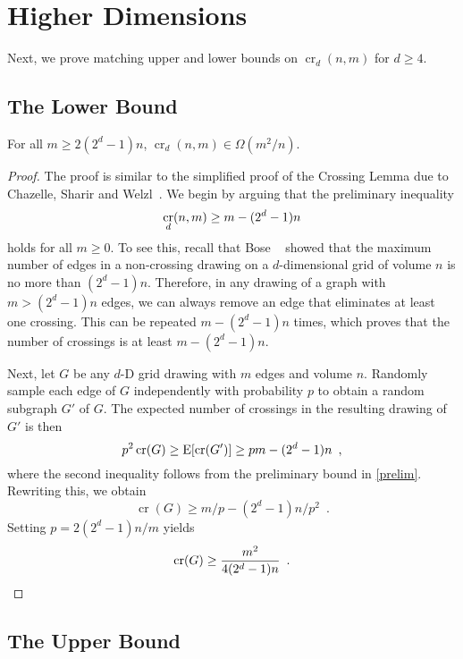 \documentclass{patmorin}
\DeclareMathOperator{\crs}{cr}
\begin{document}
\section{Higher Dimensions}

Next, we prove matching upper and lower bounds on $\crs_d(n,m)$ for
$d\ge 4$.

\subsection{The Lower Bound}

\begin{thm}
  For all $m\ge 2(2^d-1)n$, $\crs_d(n,m)\in\Omega(m^2/n)$.
\end{thm}

\begin{proof}
  The proof is similar to the simplified proof of the Crossing
  Lemma due to Chazelle, Sharir and Welzl~\cite[Chapter~30, Theorem
  4]{aigner.ziegler:proofs}.  We begin by arguing that the preliminary
  inequality
  \begin{equation}
    \crs_d(n,m) \ge m - (2^d-1)n  \eqlabel{prelim}
  \end{equation}
  holds for all $m \ge 0$.  To see this, recall that Bose
  \etal~\cite{bose.czyzowicz.ea:maximum} showed that the maximum number of
  edges in a non-crossing drawing on a $d$-dimensional grid of volume $n$
  is no more than $(2^d-1)n$.  Therefore, in any drawing of a graph with
  $m> (2^d-1)n$ edges, we can always remove an edge that eliminates at
  least one crossing.  This can be repeated $m-(2^d-1)n$ times, which
  proves that the number of crossings is at least $m-(2^d-1)n$.

  Next, let $G$ be any $d$-D grid drawing with $m$ edges and volume $n$.
  Randomly sample each edge of $G$ independently with probability $p$
  to obtain a random subgraph $G'$ of $G$.  The expected number of
  crossings in the resulting drawing of $G'$ is then
  \[  p^2\crs(G) \ge \E[\crs(G')] \ge pm - (2^d-1)n \enspace ,\] 
  where the second inequality follows from the preliminary bound
  in \eqref{prelim}.  Rewriting this, we obtain
  \[  \crs(G) \ge m/p - (2^d-1)n/p^2 \enspace . \]
  Setting $p=2(2^{d}-1)n/m$ yields
  \[  \crs(G) \ge \frac{m^2}{4(2^{d}-1)n} \enspace .  \qedhere \]
\end{proof}

\subsection{The Upper Bound}
\end{document}
